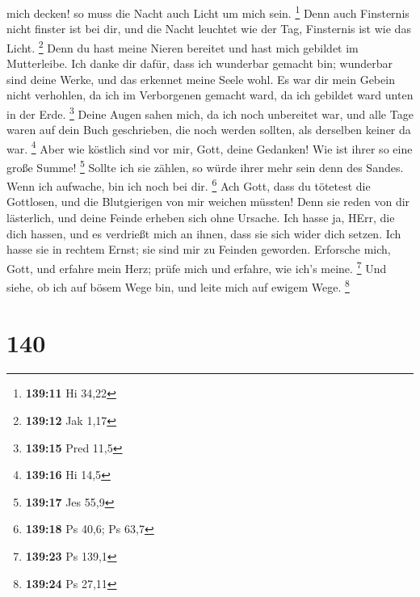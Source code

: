mich decken! so muss die Nacht auch Licht um mich sein. \footnote{\textbf{139:11}
  Hi 34,22}  Denn auch Finsternis nicht finster ist bei
dir, und die Nacht leuchtet wie der Tag, Finsternis ist wie das Licht.
\footnote{\textbf{139:12} Jak 1,17}  Denn du hast meine
Nieren bereitet und hast mich gebildet im Mutterleibe.  Ich
danke dir dafür, dass ich wunderbar gemacht bin; wunderbar sind deine
Werke, und das erkennet meine Seele wohl.  Es war dir mein
Gebein nicht verhohlen, da ich im Verborgenen gemacht ward, da ich
gebildet ward unten in der Erde. \footnote{\textbf{139:15} Pred 11,5}
 Deine Augen sahen mich, da ich noch unbereitet war, und
alle Tage waren auf dein Buch geschrieben, die noch werden sollten, als
derselben keiner da war. \footnote{\textbf{139:16} Hi 14,5}
 Aber wie köstlich sind vor mir, Gott, deine Gedanken! Wie
ist ihrer so eine große Summe! \footnote{\textbf{139:17} Jes 55,9}
 Sollte ich sie zählen, so würde ihrer mehr sein denn des
Sandes. Wenn ich aufwache, bin ich noch bei dir. \footnote{\textbf{139:18}
  Ps 40,6; Ps 63,7}  Ach Gott, dass du tötetest die
Gottlosen, und die Blutgierigen von mir weichen müssten! 
Denn sie reden von dir lästerlich, und deine Feinde erheben sich ohne
Ursache.  Ich hasse ja, HErr, die dich hassen, und es
verdrießt mich an ihnen, dass sie sich wider dich setzen. 
Ich hasse sie in rechtem Ernst; sie sind mir zu Feinden geworden.
 Erforsche mich, Gott, und erfahre mein Herz; prüfe mich
und erfahre, wie ich's meine. \footnote{\textbf{139:23} Ps 139,1}
 Und siehe, ob ich auf bösem Wege bin, und leite mich auf
ewigem Wege. \footnote{\textbf{139:24} Ps 27,11}

\hypertarget{section-43}{%
\section{140}\label{section-43}}

